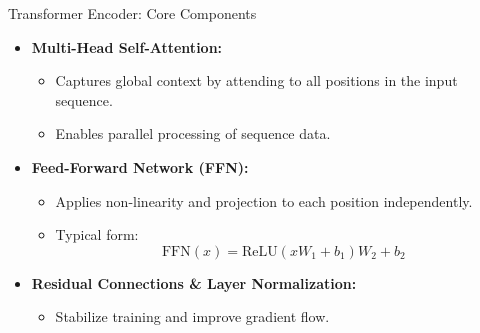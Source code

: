 \begin{frame}{Transformer Encoder: Core Components}
    \begin{itemize}
        \item \textbf{Multi-Head Self-Attention:}
        \begin{itemize}
            \item Captures global context by attending to all positions in the input sequence.
            \item Enables parallel processing of sequence data.
        \end{itemize}
        \item \textbf{Feed-Forward Network (FFN):}
        \begin{itemize}
            \item Applies non-linearity and projection to each position independently.
            \item Typical form:
            \begin{equation*}
                \mathrm{FFN}(x) = \mathrm{ReLU}(xW_1 + b_1)W_2 + b_2
            \end{equation*}
        \end{itemize}
        \item \textbf{Residual Connections \& Layer Normalization:}
        \begin{itemize}
            \item Stabilize training and improve gradient flow.
        \end{itemize}
    \end{itemize}
\end{frame}

